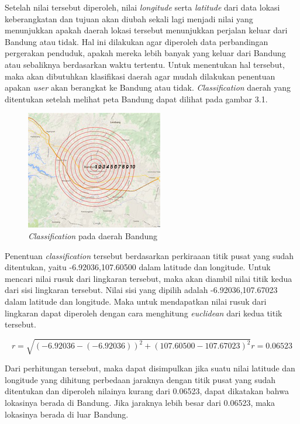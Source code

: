 Setelah nilai tersebut diperoleh, nilai \textsl{longitude} serta \textsl{latitude} dari data lokasi keberangkatan dan tujuan akan diubah sekali lagi menjadi nilai yang menunjukkan apakah daerah lokasi tersebut menunjukkan perjalan keluar dari Bandung atau tidak. Hal ini dilakukan agar diperoleh data perbandingan pergerakan penduduk, apakah mereka lebih banyak yang keluar dari Bandung atau sebaliknya berdasarkan waktu tertentu. Untuk menentukan hal tersebut, maka akan dibutuhkan klasifikasi daerah agar mudah dilakukan penentuan apakan \textsl{user} akan berangkat ke Bandung atau tidak. \textsl{Classification} daerah yang ditentukan setelah melihat peta Bandung dapat dilihat pada gambar 3.1.

\begin{figure}
\includegraphics[scale=1]{Gambar/classificationmap.jpg}
\caption[\textsl{Classification} pada daerah Bandung]{\textsl{Classification} pada daerah Bandung} 
\end{figure}

Penentuan \textsl{classification} tersebut berdasarkan perkiraaan titik pusat yang sudah ditentukan, yaitu -6.92036,107.60500 dalam latitude dan longitude. Untuk mencari nilai rusuk dari lingkaran tersebut, maka akan diambil nilai titik kedua dari sisi lingkaran tersebut. Nilai sisi yang dipilih adalah -6.92036,107.67023 dalam latitude dan longitude. Maka untuk mendapatkan nilai rusuk dari lingkaran dapat diperoleh dengan cara menghitung \textsl{euclidean} dari kedua titik tersebut.

\begin{displaymath}
	r = \sqrt{(-6.92036 - (-6.92036))^{2} + (107.60500 - 107.67023)^{2}}
	r = 0.06523
\end{displaymath}

Dari perhitungan tersebut, maka dapat disimpulkan jika suatu nilai latitude dan longitude yang dihitung perbedaan jaraknya dengan titik pusat yang sudah ditentukan dan diperoleh nilainya kurang dari 0.06523, dapat dikatakan bahwa lokasinya berada di Bandung. Jika jaraknya lebih besar dari 0.06523, maka lokasinya berada di luar Bandung.

